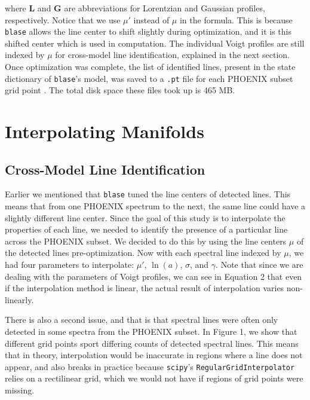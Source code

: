 \documentclass[twocolumn]{aastex631}
\begin{document}
where $\mathbf{L}$ and $\mathbf{G}$ are abbreviations for Lorentzian and 
Gaussian profiles, respectively. Notice that we use $\mu'$ instead of $\mu$ 
in the formula. This is because \texttt{blase} allows the line center to shift 
slightly during optimization, and it is this shifted center which is used in 
computation. The individual Voigt profiles are still indexed by $\mu$ for 
cross-model line identification, explained in the next section. Once optimization 
was complete, the list of identified lines, present in the state dictionary of 
\texttt{blase}'s model, was saved to a \texttt{.pt} file for each PHOENIX subset 
grid point \citep{pytorch}. The total disk space these files took up is 465 MB.

\section{Interpolating Manifolds}
\subsection{Cross-Model Line Identification}
Earlier we mentioned that \texttt{blase} tuned the line centers of
detected lines. This means that from one PHOENIX spectrum to the next, the
same line could have a slightly different line center. Since the goal of this
study is to interpolate the properties of each line, we needed to identify the
presence of a particular line across the PHOENIX subset. We decided to do
this by using the line centers $\mu$ of the detected lines pre-optimization. 
Now with each spectral line indexed by $\mu$, we had four parameters to interpolate:
$\mu'$, $\ln(a)$, $\sigma$, and $\gamma$. Note that since we are dealing with 
the parameters of Voigt profiles, we can see in Equation 2 that even if the 
interpolation method is linear, the actual result of interpolation varies 
non-linearly.

There is also a second issue, and that is that spectral lines were often
only detected in some spectra from the PHOENIX subset. In Figure 1, we show
that different grid points sport differing counts of detected spectral lines.
This means that in theory, interpolation would be inaccurate in regions where 
a line does not appear, and also breaks in practice because \texttt{scipy}'s 
\texttt{RegularGridInterpolator} relies on a rectilinear grid, which we would not 
have if regions of grid points were missing. 
\end{document}
